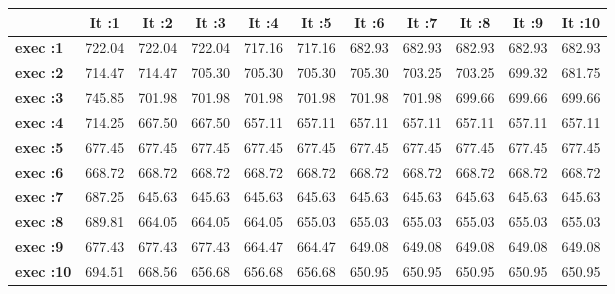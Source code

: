 \begin{tiny}\begin{tabular}{|l|c|c|c|c|c|c|c|c|c|c|}
\hline
&\textbf{It :1}&\textbf{It :2}&\textbf{It :3}&\textbf{It :4}&\textbf{It :5}&\textbf{It :6}&\textbf{It :7}&\textbf{It :8}&\textbf{It :9}&\textbf{It :10}\\\hline
\textbf{exec :1}&722.04&722.04&722.04&717.16&717.16&682.93&682.93&682.93&682.93&682.93\\\hline
\textbf{exec :2}&714.47&714.47&705.30&705.30&705.30&705.30&703.25&703.25&699.32&681.75\\\hline
\textbf{exec :3}&745.85&701.98&701.98&701.98&701.98&701.98&701.98&699.66&699.66&699.66\\\hline
\textbf{exec :4}&714.25&667.50&667.50&657.11&657.11&657.11&657.11&657.11&657.11&657.11\\\hline
\textbf{exec :5}&677.45&677.45&677.45&677.45&677.45&677.45&677.45&677.45&677.45&677.45\\\hline
\textbf{exec :6}&668.72&668.72&668.72&668.72&668.72&668.72&668.72&668.72&668.72&668.72\\\hline
\textbf{exec :7}&687.25&645.63&645.63&645.63&645.63&645.63&645.63&645.63&645.63&645.63\\\hline
\textbf{exec :8}&689.81&664.05&664.05&664.05&655.03&655.03&655.03&655.03&655.03&655.03\\\hline
\textbf{exec :9}&677.43&677.43&677.43&664.47&664.47&649.08&649.08&649.08&649.08&649.08\\\hline
\textbf{exec :10}&694.51&668.56&656.68&656.68&656.68&650.95&650.95&650.95&650.95&650.95\\\hline
\end{tabular}
\end{tiny}